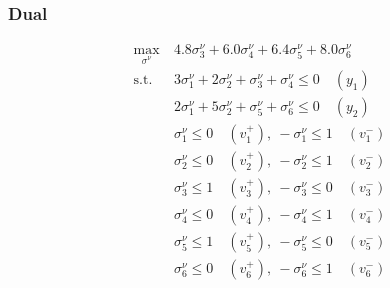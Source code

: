 \documentclass{beamer}
\begin{document}
\begin{frame}
\frametitle{Dual}	

\begin{align*}
\max_{\sigma^{\nu}}\ & 4.8\sigma_3^{\nu} + 6.0\sigma_4^{\nu} + 6.4\sigma_5^{\nu} + 8.0\sigma_6^{\nu} \\
\mbox{s.t. } & 3\sigma_1^{\nu} + 2 \sigma_2^{\nu} + \sigma_3^{\nu} + \sigma_4^{\nu} \leq 0  \quad (y_1)\\
& 2\sigma_1^{\nu} + 5 \sigma_2^{\nu} + \sigma_5^{\nu} + \sigma_6^{\nu} \leq 0 \quad (y_2)\\
& \sigma_1^{\nu} \leq 0 \quad (v_1^+),\ -\sigma_1^{\nu} \leq 1 \quad (v_1^-) \\
& \sigma_2^{\nu} \leq 0 \quad (v_2^+),\ -\sigma_2^{\nu} \leq 1 \quad (v_2^-) \\
& \sigma_3^{\nu} \leq 1 \quad (v_3^+),\ -\sigma_3^{\nu} \leq 0 \quad (v_3^-) \\ 
& \sigma_4^{\nu} \leq 0 \quad (v_4^+),\ -\sigma_4^{\nu} \leq 1 \quad (v_4^-) \\
& \sigma_5^{\nu} \leq 1 \quad (v_5^+),\ -\sigma_5^{\nu} \leq 0 \quad  (v_5^-) \\
& \sigma_6^{\nu} \leq 0 \quad (v_6^+),\ -\sigma_6^{\nu} \leq 1 \quad  (v_6^-) %
\end{align*}
	
\end{frame}



\end{document}

